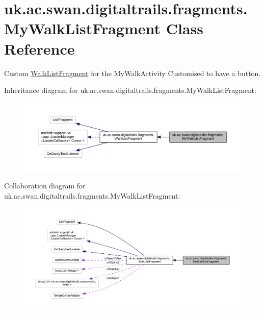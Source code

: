 \hypertarget{classuk_1_1ac_1_1swan_1_1digitaltrails_1_1fragments_1_1_my_walk_list_fragment}{\section{uk.\+ac.\+swan.\+digitaltrails.\+fragments.\+My\+Walk\+List\+Fragment Class Reference}
\label{classuk_1_1ac_1_1swan_1_1digitaltrails_1_1fragments_1_1_my_walk_list_fragment}
}


Custom \hyperlink{classuk_1_1ac_1_1swan_1_1digitaltrails_1_1fragments_1_1_walk_list_fragment}{Walk\+List\+Fragment} for the My\+Walk\+Activity Customised to have a button.  




Inheritance diagram for uk.\+ac.\+swan.\+digitaltrails.\+fragments.\+My\+Walk\+List\+Fragment\+:\nopagebreak
\begin{figure}[H]
\begin{center}
\leavevmode
\includegraphics[width=350pt]{classuk_1_1ac_1_1swan_1_1digitaltrails_1_1fragments_1_1_my_walk_list_fragment__inherit__graph}
\end{center}
\end{figure}


Collaboration diagram for uk.\+ac.\+swan.\+digitaltrails.\+fragments.\+My\+Walk\+List\+Fragment\+:\nopagebreak
\begin{figure}[H]
\begin{center}
\leavevmode
\includegraphics[width=350pt]{classuk_1_1ac_1_1swan_1_1digitaltrails_1_1fragments_1_1_my_walk_list_fragment__coll__graph}
\end{center}
\end{figure}
